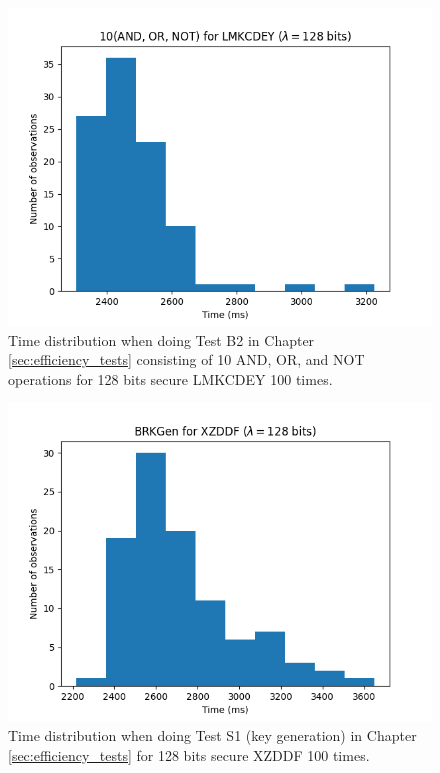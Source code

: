 \begin{figure}[ht]
    \centering
    \includegraphics[width=0.8\linewidth]{data/figures/LMKCDEY_STD128LMKCDEY_10AND_OR_NOT.png}
    \caption{Time distribution when doing Test B2 in Chapter \ref{sec:efficiency_tests} consisting of 10 AND, OR, and NOT operations for 128 bits secure LMKCDEY 100 times.}
    \label{fig:distr_lmkcdey128_10}
\end{figure}

\begin{figure}[ht]
    \centering
    \includegraphics[width=0.8\linewidth]{data/figures/XZDDF_STD128_BRKGen.png}
    \caption{Time distribution when doing Test S1 (key generation) in Chapter \ref{sec:efficiency_tests} for 128 bits secure XZDDF 100 times.}
    \label{fig:distr_xzddf128_keygen}
\end{figure}

